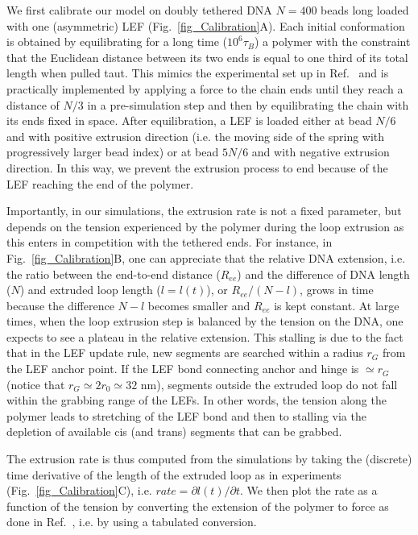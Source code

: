 \documentclass[aps,prl,twocolumn,a4paper,10pt,notitlepage,footinbib,nobalancelastpage,superscriptaddress,showpacs,floatfix]{revtex4-1}%
\begin{document}
We first calibrate our model on doubly tethered DNA $N=400$ beads long loaded with one (asymmetric) LEF (Fig.~\ref{fig_Calibration}A). Each initial conformation is obtained by equilibrating for a long time ($10^6\tau_B$) a polymer with the constraint that the Euclidean distance between its two ends is equal to one third of its total length when pulled taut. This mimics the experimental set up in Ref.~\cite{Ganji2018} and is practically implemented by applying a force to the chain ends until they reach a distance of $N/3$ in a pre-simulation step and then by equilibrating the chain with its ends fixed in space. After equilibration, a LEF is loaded either at bead $N/6$ and with positive extrusion direction (i.e. the moving side of the spring with progressively larger bead index) or at bead $5N/6$ and with negative extrusion direction. In this way, we prevent the extrusion process to end because of the LEF reaching the end of the polymer.  

Importantly, in our simulations, the extrusion rate is not a fixed parameter, but depends on the tension experienced by the polymer during the loop extrusion as this enters in competition with the tethered ends. For instance, in Fig.~\ref{fig_Calibration}B, one can appreciate that the relative DNA extension, i.e. the ratio between the end-to-end distance  ($R_{ee}$) and the difference of DNA length ($N$) and extruded loop length ($l=l(t)$), or $R_{ee}/(N-l)$, grows in time because the difference $N-l$ becomes smaller and $R_{ee}$ is kept constant. At large times, when the loop extrusion step is balanced by the tension on the DNA, one expects to see a plateau in the relative extension. This stalling is due to the fact that in the LEF update rule, new segments are searched within a radius $r_G$ from the LEF anchor point. If the LEF bond connecting anchor and hinge is $\simeq r_G$ (notice that $r_G \simeq 2 r_0 \simeq 32$ nm), segments outside the extruded loop do not fall within the grabbing range of the LEFs. In other words, the tension along the polymer leads to stretching of the LEF bond and then to stalling via the depletion of available cis (and trans) segments that can be grabbed. 

The extrusion rate is thus computed from the simulations by taking the (discrete) time derivative of the length of the extruded loop as in experiments (Fig.~\ref{fig_Calibration}C), i.e. $rate = \partial l(t)/\partial t$.  We then plot the rate as a function of the tension by converting the extension of the polymer to force as done in Ref.~\cite{Ganji2018}, i.e. by using a tabulated conversion. 
\end{document}
